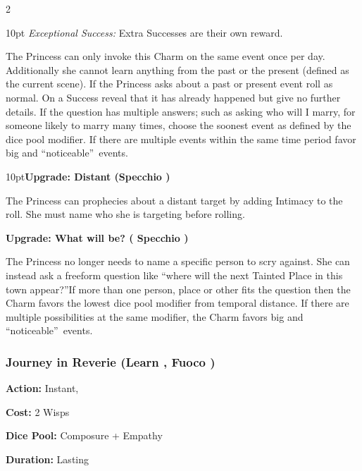 \begin{multicols}{2}
\begin{myindentpar}{10pt}
    \emph{Exceptional Success:} Extra Successes are their own reward.\end{myindentpar}

The Princess can only invoke this Charm on the same event once per day. Additionally she cannot learn anything from the past or the present (defined as the current scene). If the Princess asks about a past or present event roll as normal. On a Success reveal that it has already happened but give no further details. If the question has multiple answers; such as asking who will I marry, for someone likely to marry many times, choose the soonest event as defined by the dice pool modifier. If there are multiple events within the same time period favor big and \textquotedblleft noticeable\textquotedblright\, events.

\begin{myindentpar}{10pt}\textbf{Upgrade: Distant (Specchio \textbullet\textbullet\textbullet\textbullet)}

The Princess can prophecies about a distant target by adding Intimacy to the roll. She must name who she is targeting before rolling.

\textbf{Upgrade: What will be? ( Specchio \textbullet\textbullet\textbullet\textbullet\textbullet)}

The Princess no longer needs to name a specific person to scry against. She can instead ask a freeform question like \textquotedblleft where will the next Tainted Place in this town appear?\textquotedblright If more than one person, place or other fits the question then the Charm favors the lowest dice pool modifier from temporal distance. If there are multiple possibilities at the same modifier, the Charm favors big and \textquotedblleft noticeable\textquotedblright\, events. \end{myindentpar}

\subsubsection*{Journey in Reverie (Learn \textbullet\textbullet\textbullet\textbullet, Fuoco \textbullet\textbullet\textbullet)}

\noindent \textbf{Action:} Instant, 

\noindent \textbf{Cost:} 2 Wisps

\noindent \textbf{Dice Pool:} Composure + Empathy

\noindent \textbf{Duration:} Lasting \\


\end{multicols}
